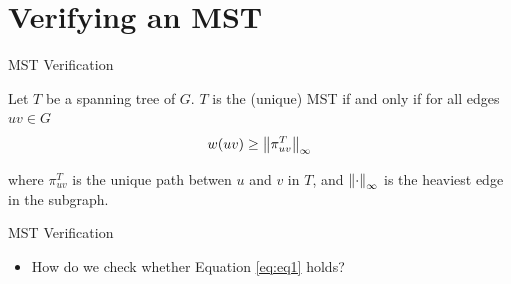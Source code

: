 \documentclass[aspectratio=169]{beamer}
\begin{document}
\frame{\tableofcontents}

\section{Verifying an MST}
\frame{\tableofcontents[currentsection]}

\begin{frame}{MST Verification}
    \begin{theorem}
        Let $T$ be a spanning tree of $G$.
        $T$ is the (unique) MST if and only if for all edges $uv \in G$
        \begin{equation}
            w(uv) \ge \norm{ \pi^{T}_{uv} }_\infty
            \label{eq:eq1}
        \end{equation}

        where $\pi^{T}_{uv}$ is the unique path betwen $u$ and $v$ in $T$, and $\norm{\cdot}_{\infty}$ is the heaviest edge in the subgraph.
    \end{theorem}
\end{frame}

\begin{frame}{MST Verification}
    \begin{itemize}
        \item How do we check whether Equation \ref{eq:eq1} holds?
    \end{itemize}
\end{frame}
\end{document}

